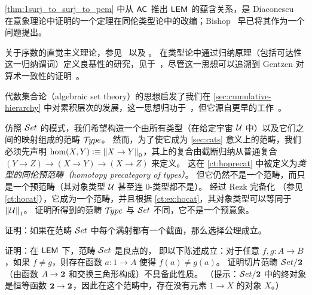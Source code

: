 \cref{thm:1surj_to_surj_to_pem} 中从 $\mathsf{AC}_{}$ 推出 $\mathsf{LEM}_{}$ 的蕴含关系，是 Diaconescu~\cite{Diaconescu} 在意象理论中证明的一个定理在同伦类型论中的改编；Bishop~\cite[Problem~2]{Bishop1967} 早已将其作为一个问题提出。

关于序数的直觉主义理论，参见~\cite{taylor:ordinals,Taylor99} 以及 \cite{JoyalMoerdijk1995}。
在类型论中通过归纳原理（包括可达性这一归纳谓词）定义良基性的研究，见于~\cite{Huet80,Paulson86,Nordstrom88}，尽管这一思想可以追溯到 Gentzen 对算术一致性的证明~\cite{Gentzen36}。

代数集合论（algebraic set theory）的思想启发了我们在 \cref{sec:cumulative-hierarchy} 中对累积层次的发展，这一思想归功于~\cite{JoyalMoerdijk1995}，但它源自更早的工作~\cite{AczelCZF}。
%
%

\sectionExercises

\begin{ex}\label{ex:utype-ct}
  仿照 $\mathcal{S}et$ 的模式，我们希望构造一个由所有类型（在给定宇宙 $\mathcal{U}$ 中）以及它们之间的映射组成的范畴 $\mathcal{T}\!ype$。
  然而，为了使它成为 \cref{sec:cats} 意义上的范畴，我们必须先声明 $\hom(X,Y) \vcentcolon\equiv \mathopen{}\left\Vert X\to Y\right\Vert_{0}\mathclose{}$，其上的复合由截断归纳从普通复合 $(Y\to Z) \to (X\to Y) \to (X\to Z)$ 来定义。
  这在 \cref{ct:hoprecat} 中被定义为\emph{类型的同伦预范畴（homotopy precategory of types）}。
  但它仍然不是一个范畴，而只是一个预范畴（其对象类型 $\mathcal{U}$ 甚至连 $0$-类型都不是）。
  经过 Rezk 完备化
  （参见 \cref{ct:hocat}），它成为一个范畴，并且根据 \cref{ct:ex:hocat}，其对象类型可以等同于 $\mathopen{}\left\Vert \mathcal{U}\right\Vert_{1}\mathclose{}$。
  证明所得到的范畴 $\mathcal{T}\!ype$ 与 $\mathcal{S}et$ 不同，它不是一个预意象。
\end{ex}

\begin{ex}\label{ex:surjections-have-sections-impl-ac}
  证明：如果在范畴 $\mathcal{S}et$ 中每个满射都有一个截面，那么选择公理成立。
\end{ex}

\begin{ex}\label{ex:well-pointed}
  证明：在 $\mathsf{LEM}_{}$ 下，范畴 $\mathcal{S}et$ 是良点的，
  即以下陈述成立：对于任意 $f, g : A\to B$，如果 $f \neq g$，则存在函数 $a : 1\to A$ 使得 $f(a) \neq g(a)$。
  证明切片范畴
  $\mathcal{S}et/\mathbf{2}$（由函数 $A\to \mathbf{2}$ 和交换三角形构成）不具备此性质。
  （提示：$\mathcal{S}et/\mathbf{2}$ 中的终对象是恒等函数 $\mathbf{2} \to \mathbf{2}$，因此在这个范畴中，存在没有元素 $1\to X$ 的对象 $X$。）
\end{ex}


